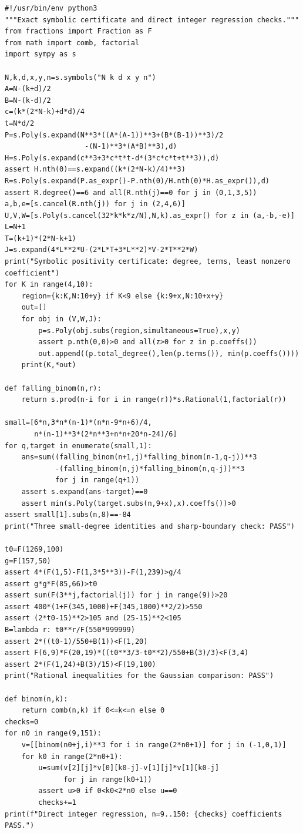 \documentclass[11pt,a4paper]{article}
\begin{document}
\begin{Verbatim}[fontsize=\scriptsize,breaklines,breakanywhere]
#!/usr/bin/env python3
"""Exact symbolic certificate and direct integer regression checks."""
from fractions import Fraction as F
from math import comb, factorial
import sympy as s

N,k,d,x,y,n=s.symbols("N k d x y n")
A=N-(k+d)/2
B=N-(k-d)/2
c=(k*(2*N-k)+d*d)/4
t=N*d/2
P=s.Poly(s.expand(N**3*((A*(A-1))**3+(B*(B-1))**3)/2
                   -(N-1)**3*(A*B)**3),d)
H=s.Poly(s.expand(c**3+3*c*t*t-d*(3*c*c*t+t**3)),d)
assert H.nth(0)==s.expand((k*(2*N-k)/4)**3)
R=s.Poly(s.expand(P.as_expr()-P.nth(0)/H.nth(0)*H.as_expr()),d)
assert R.degree()==6 and all(R.nth(j)==0 for j in (0,1,3,5))
a,b,e=[s.cancel(R.nth(j)) for j in (2,4,6)]
U,V,W=[s.Poly(s.cancel(32*k*k*z/N),N,k).as_expr() for z in (a,-b,-e)]
L=N+1
T=(k+1)*(2*N-k+1)
J=s.expand(4*L**2*U-(2*L*T+3*L**2)*V-2*T**2*W)
print("Symbolic positivity certificate: degree, terms, least nonzero coefficient")
for K in range(4,10):
    region={k:K,N:10+y} if K<9 else {k:9+x,N:10+x+y}
    out=[]
    for obj in (V,W,J):
        p=s.Poly(obj.subs(region,simultaneous=True),x,y)
        assert p.nth(0,0)>0 and all(z>0 for z in p.coeffs())
        out.append((p.total_degree(),len(p.terms()), min(p.coeffs())))
    print(K,*out)

def falling_binom(n,r):
    return s.prod(n-i for i in range(r))*s.Rational(1,factorial(r))

small=[6*n,3*n*(n-1)*(n*n-9*n+6)/4,
       n*(n-1)**3*(2*n**3+n*n+20*n-24)/6]
for q,target in enumerate(small,1):
    ans=sum((falling_binom(n+1,j)*falling_binom(n-1,q-j))**3
            -(falling_binom(n,j)*falling_binom(n,q-j))**3
            for j in range(q+1))
    assert s.expand(ans-target)==0
    assert min(s.Poly(target.subs(n,9+x),x).coeffs())>0
assert small[1].subs(n,8)==-84
print("Three small-degree identities and sharp-boundary check: PASS")

t0=F(1269,100)
g=F(157,50)
assert 4*(F(1,5)-F(1,3*5**3))-F(1,239)>g/4
assert g*g*F(85,66)>t0
assert sum(F(3**j,factorial(j)) for j in range(9))>20
assert 400*(1+F(345,1000)+F(345,1000)**2/2)>550
assert (2*t0-15)**2>105 and (25-15)**2<105
B=lambda r: t0**r/F(550*999999)
assert 2*((t0-1)/550+B(1))<F(1,20)
assert F(6,9)*F(20,19)*((t0**3/3-t0**2)/550+B(3)/3)<F(3,4)
assert 2*(F(1,24)+B(3)/15)<F(19,100)
print("Rational inequalities for the Gaussian comparison: PASS")

def binom(n,k):
    return comb(n,k) if 0<=k<=n else 0
checks=0
for n0 in range(9,151):
    v=[[binom(n0+j,i)**3 for i in range(2*n0+1)] for j in (-1,0,1)]
    for k0 in range(2*n0+1):
        u=sum(v[2][j]*v[0][k0-j]-v[1][j]*v[1][k0-j]
              for j in range(k0+1))
        assert u>0 if 0<k0<2*n0 else u==0
        checks+=1
print(f"Direct integer regression, n=9..150: {checks} coefficients PASS.")
\end{Verbatim}
\end{document}
